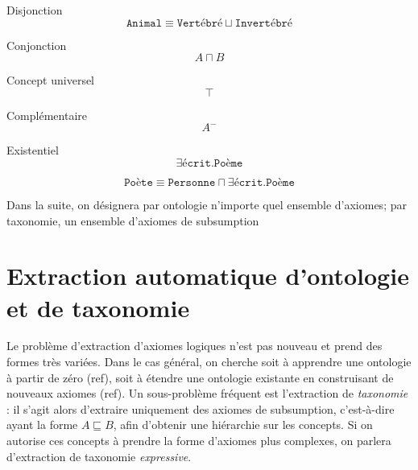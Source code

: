 Disjonction
\begin{equation}
    \texttt{Animal} \equiv \texttt{Vertébré} \sqcup \texttt{Invertébré}
\end{equation}

Conjonction
\begin{equation}
    A \sqcap B
\end{equation}

Concept universel
\begin{equation}
    \top
\end{equation}

Complémentaire
\begin{equation}
    A^-
\end{equation}

Existentiel
\begin{equation}
    \exists \texttt{écrit}.\texttt{Poème}
\end{equation}

\begin{equation}
    \texttt{Poète} \equiv \texttt{Personne} \sqcap \exists \texttt{écrit}.\texttt{Poème}
\end{equation}



Dans la suite, on désignera par ontologie n'importe quel ensemble d'axiomes; par taxonomie, un ensemble d'axiomes de subsumption



\section{Extraction automatique d'ontologie et de taxonomie}


Le problème d'extraction d'axiomes logiques n'est pas nouveau et prend des formes très variées. Dans le cas général, on cherche soit à apprendre une ontologie à partir de zéro (ref), soit à étendre une ontologie existante en construisant de nouveaux axiomes (ref). Un sous-problème fréquent est l'extraction de \textit{taxonomie} : il s'agit alors d'extraire uniquement des axiomes de subsumption, c'est-à-dire ayant la forme $A \sqsubseteq B$, afin d'obtenir une hiérarchie sur les concepts. Si on autorise ces concepts à prendre la forme d'axiomes plus complexes, on parlera d'extraction de taxonomie \textit{expressive}. 

